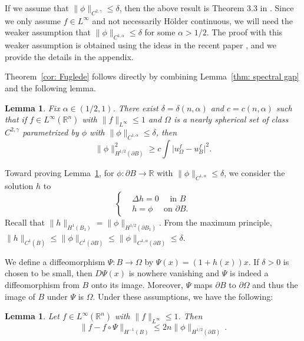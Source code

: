 \documentclass[10pt, reqno]{amsart}
\numberwithin{equation}{section}
\newtheorem{lemma}[theorem]{Lemma}
\def\R{{\mathbb R}}
\def\W{\Omega}
\begin{document}
  {  If we assume that $\| \phi\|_{C^{2,\gamma}} \leq \delta$, then the above result is Theorem 3.3 in \cite{BDV15}. Since we only assume $f \in L^{\infty}$ and not necessarily H\"older continuous, we will need the weaker assumption that $\| \phi\|_{C^{1,\alpha}} \leq \delta$ for some $\alpha>1/2$. The proof with this weaker assumption is obtained using the ideas in the recent paper \cite{p24}, and we provide the details in the appendix. }



Theorem~\ref{cor: Fuglede} follows directly by combining 
Lemma~\ref{thm: spectral gap} and the following lemma.
\begin{lemma}\label{lem: beta on NSS}
{Fix $\alpha \in (1/2,1)$. There exist $\delta = \delta(n,\alpha)$ and $c=c(n,\alpha)$ such that if $f \in L^\infty(\R^n)$ with $\| f\|_{L^\infty}\leq 1$ and $\W$ is a nearly spherical set of class $C^{2,\gamma}$ parametrized by $\phi$ with $\| \phi\|_{C^{1,\alpha}} \leq \delta$,} then
	\[
	\| \phi \|_{H^{1/2}(\partial B)}^2 \geq c \int \big| u_\W^f - u_{B}^f\big|^2 .
	\]
\end{lemma}


Toward proving Lemma~\ref{lem: beta on NSS},  for $\phi: \partial B\to \R$ with {$\| \phi\|_{C^{1,\alpha}} \leq \delta$}, we consider the solution $h$ to 
\begin{equation} \label{e:h}
 \begin{cases}
  &\Delta h=0 \quad \text{ in } B \\
  &h=\phi \quad \text{ on } \partial B. 
 \end{cases}
\end{equation}
Recall that $\| h\|_{H^1(B_1)}=\| \phi\|_{H^{1/2}(\partial B_1)}$. 
From the maximum principle,  $\|h \|_{C^1(\overline{B})} \leq \| \phi \|_{C^1(\partial B)} 
\leq \| \phi\|_{C^{1,\alpha}(\partial B)}\leq \delta$. 



We define a diffeomorphism  $\Psi: B\to \Omega$  by  $\Psi(x) = (1 + h(x) ) x$. If $\delta>0$ is chosen to be small, then $D\Psi(x)$ is nowhere vanishing and $\Psi$ is indeed a diffeomorphism from $B$ onto its image. Moreover, $\Psi$ maps $\partial B$ to $\partial \W$ and thus the image of $B$ under $\Psi$ is $\W$. Under these assumptions, we have the following:
\begin{lemma} \label{l:LNbound}
 Let $f \in L^{\infty}(\mathbb{R}^n)$ with $\| f\|_{L^\infty}\leq 1$. Then  
 \[
 \| f- f\circ \Psi \|_{H^{-1}(B)} \leq 2n\| \phi\|_{H^{1/2}(\partial B)}\,.
 \]
\end{lemma}
\end{document}
